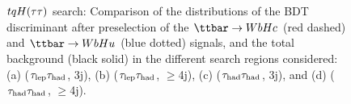 \begin{figure}[t]
\begin{center}
 \\
 \\
\caption{$tqH(\tau\tau)$ search: Comparison of the distributions of the BDT discriminant after preselection of the $\Hc$ (red dashed) and $\Hu$ (blue dotted) signals, 
and the total background (black solid) in the different search regions considered:
(a) ($\tau_{\mathrm{lep}} \tau_{\mathrm{had}}$, 3j), (b) ($\tau_{\mathrm{lep}} \tau_{\mathrm{had}}$, $\geq$4j), (c) ($\tau_{\mathrm{had}} \tau_{\mathrm{had}}$, 3j), and (d) ($\tau_{\mathrm{had}} \tau_{\mathrm{had}}$, $\geq$4j). }
\label{fig:BDT}
\end{center}
\end{figure}
